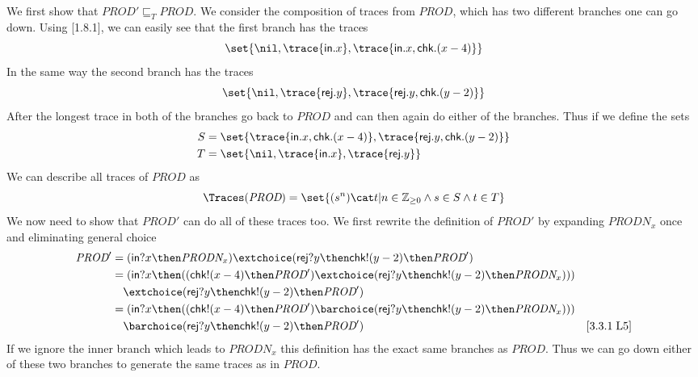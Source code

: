 \documentclass[a4paper, 11pt]{article}
\def\Prod{\textit{PROD}}
\def\Prodnx{\textit{PRODN}_x}
\def\inc{\textsf{in}}
\def\chk{\textsf{chk}}
\def\rej{\textsf{rej}}
\newcommand{\law}[2]{[#1\;\text{#2}]}
\begin{document}
We first show that $\Prod' \sqsubseteq_T \Prod$. We consider the composition of traces from $\Prod$, which has two different branches one can go down. Using \law{1.8.1}{L2-L3}, we can easily see that the first branch has the traces
\[
\set{\nil, \trace{\inc . x}, \trace{\inc . x, \chk . (x-4)}}
\]
In the same way the second branch has the traces
\[
\set{\nil, \trace{\rej . y}, \trace{\rej . y, \chk . (y-2)}}
\]
After the longest trace in both of the branches go back to $\Prod$ and can then again do either of the branches. Thus if we define the sets
\begin{align*}
S &= \set{\trace{\inc . x, \chk . (x-4)}, \trace{\rej . y, \chk . (y-2)}} \\
T &= \set{\nil, \trace{\inc . x}, \trace{\rej . y}}
\end{align*}
We can describe all traces of $\Prod$ as
\[
    \Traces(\Prod) = \set{(s^n) \cat t | n \in \mathbb{Z}_{\ge 0} \land s \in S \land t \in T}
\]
We now need to show that $\Prod'$ can do all of these traces too. We first rewrite the definition of $\Prod'$ by expanding $\Prodnx$ once and eliminating general choice
\begin{align*}
    \Prod'
    &= (\inc ? x \then \Prodnx) \extchoice (\rej ? y \then \chk ! (y-2) \then \Prod') \\
    & = (\inc ? x \then ((\chk ! (x-4) \then \Prod') \extchoice (\rej ? y \then \chk ! (y-2) \then \Prodnx))) \\
    &\quad \extchoice (\rej ? y \then \chk ! (y-2) \then \Prod') \\
    & = (\inc ? x \then ((\chk ! (x-4) \then \Prod') \barchoice (\rej ? y \then \chk ! (y-2) \then \Prodnx))) \\
    &\quad \barchoice (\rej ? y \then \chk ! (y-2) \then \Prod') & \law{3.3.1}{L5} \\
\end{align*}
If we ignore the inner branch which leads to $\Prodnx$ this definition has the exact same branches as $\Prod$. Thus we can go down either of these two branches to generate the same traces as in $\Prod$.
\end{document}
